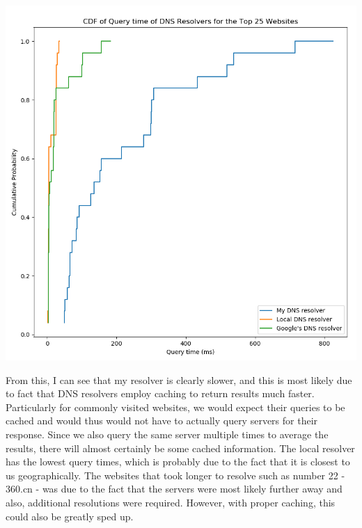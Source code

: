 \documentclass[12pt]{article}
\begin{document}
\begin{center}
	\includegraphics*[scale=0.75]{part_c_graph.png}
\end{center}


From this, I can see that my resolver is clearly slower, and this is most likely
due to fact that DNS resolvers employ caching to return results much faster.
Particularly for commonly visited websites, we would expect their queries to be
cached and would thus would not have to actually query servers for their
response. Since we also query the same server multiple times to average the results, there will almost certainly be some cached information. The local resolver has the lowest query times, which is probably due to the fact that it is closest to us geographically. The websites that took longer to resolve such as number 22 - 360.cn - was due to the fact that the servers were most likely further away and also, additional resolutions were required. However, with proper caching, this could also be greatly sped up.
\end{document}
